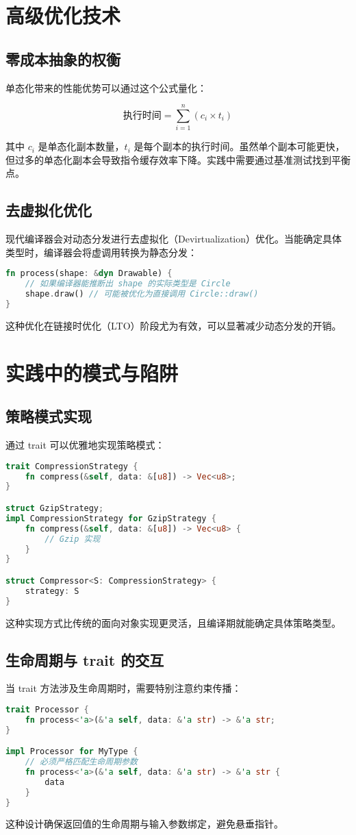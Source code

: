 \chapter{高级优化技术}
\section{零成本抽象的权衡}
单态化带来的性能优势可以通过这个公式量化：\par
$$ \text{执行时间} = \sum_{i=1}^{n} (c_i \times t_i) $$\par
其中 $c_i$ 是单态化副本数量，$t_i$ 是每个副本的执行时间。虽然单个副本可能更快，但过多的单态化副本会导致指令缓存效率下降。实践中需要通过基准测试找到平衡点。\par
\section{去虚拟化优化}
现代编译器会对动态分发进行去虚拟化（Devirtualization）优化。当能确定具体类型时，编译器会将虚调用转换为静态分发：\par
\begin{lstlisting}[language=rust]
fn process(shape: &dyn Drawable) {
    // 如果编译器能推断出 shape 的实际类型是 Circle
    shape.draw() // 可能被优化为直接调用 Circle::draw()
}
\end{lstlisting}
这种优化在链接时优化（LTO）阶段尤为有效，可以显著减少动态分发的开销。\par
\chapter{实践中的模式与陷阱}
\section{策略模式实现}
通过 trait 可以优雅地实现策略模式：\par
\begin{lstlisting}[language=rust]
trait CompressionStrategy {
    fn compress(&self, data: &[u8]) -> Vec<u8>;
}

struct GzipStrategy;
impl CompressionStrategy for GzipStrategy {
    fn compress(&self, data: &[u8]) -> Vec<u8> {
        // Gzip 实现
    }
}

struct Compressor<S: CompressionStrategy> {
    strategy: S
}
\end{lstlisting}
这种实现方式比传统的面向对象实现更灵活，且编译期就能确定具体策略类型。\par
\section{生命周期与 trait 的交互}
当 trait 方法涉及生命周期时，需要特别注意约束传播：\par
\begin{lstlisting}[language=rust]
trait Processor {
    fn process<'a>(&'a self, data: &'a str) -> &'a str;
}

impl Processor for MyType {
    // 必须严格匹配生命周期参数
    fn process<'a>(&'a self, data: &'a str) -> &'a str {
        data
    }
}
\end{lstlisting}
这种设计确保返回值的生命周期与输入参数绑定，避免悬垂指针。\par
